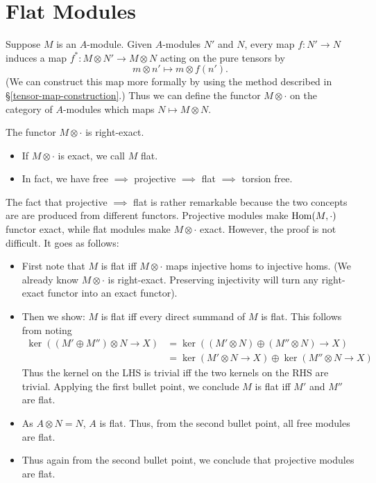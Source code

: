 \section{Flat Modules}
Suppose $M$ is an $A$-module. Given $A$-modules $N'$ and $N$, every map $f: N' \rightarrow N$ induces a map $f^*: M \otimes N' \rightarrow M \otimes N$ acting on the pure tensors by
\[
    m \otimes n' \mapsto m \otimes f(n').
\]
(We can construct this map more formally by using the method described in \S \ref{tensor-map-construction}.) Thus we can define the functor $M \otimes \cdot$ on the category of $A$-modules which maps $N \mapsto M \otimes N$.

The functor $M \otimes \cdot$ is right-exact.
\begin{itemize}
    \item If $M \otimes \cdot$ is exact, we call $M$ flat.
    \item In fact, we have free $\implies$ projective $\implies$ flat $\implies$ torsion free.
\end{itemize}
The fact that projective $\implies$ flat is rather remarkable because the two concepts are are produced from different functors. Projective modules make $\operatorname{Hom}(M, \cdot)$ functor exact, while flat modules make $M \otimes \cdot$ exact. However, the proof is not difficult. It goes as follows:
\begin{itemize}
    \item First note that $M$ is flat iff $M \otimes \cdot$ maps injective homs to injective homs. (We already know $M \otimes \cdot$ is right-exact. Preserving injectivity will turn any right-exact functor into an exact functor).
    \item Then we show: $M$ is flat iff every direct summand of $M$ is flat. This follows from noting
        \[
            \begin{split}
                \ker\left((M' \oplus M'') \otimes N \rightarrow X\right) &= \ker\left((M' \otimes N) \oplus (M'' \otimes N) \rightarrow X\right)\\
                                                                        &= \ker\left(M' \otimes N \rightarrow X\right) \oplus \ker\left(M'' \otimes N \rightarrow X\right)
            \end{split}
        \]
        Thus the kernel on the LHS is trivial iff the two kernels on the RHS are trivial. Applying the first bullet point, we conclude $M$ is flat iff $M'$ and $M''$ are flat.
    \item As $A \otimes N = N$, $A$ is flat. Thus, from the second bullet point, all free modules are flat.
    \item Thus again from the second bullet point, we conclude that projective modules are flat.
\end{itemize}
